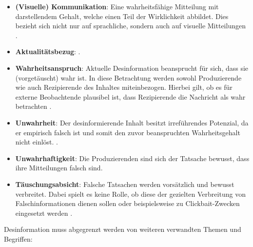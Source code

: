 \documentclass[12pt,a4paper]{article}        %
\begin{document}
\begin{itemize}
  \item \textbf{(Visuelle) Kommunikation}: Eine wahrheitsfähige Mitteilung mit darstellendem Gehalt, welche einen Teil der Wirklichkeit abbildet. Dies bezieht sich nicht nur auf sprachliche, sondern auch auf visuelle Mitteilungen \parencite[151]{marx_fake_2020}.
  \item \textbf{Aktualitätsbezug}:  \parencite[152]{marx_fake_2020}.
  \item \textbf{Wahrheitsanspruch}: Aktuelle Desinformation beansprucht für sich, dass sie (vorgetäuscht) wahr ist. In diese Betrachtung werden sowohl Produzierende wie auch Rezipierende des Inhaltes miteinbezogen. Hierbei gilt, ob es für externe Beobachtende plausibel ist, dass Rezipierende die Nachricht als wahr betrachten \parencite[153]{marx_fake_2020}.
  \item \textbf{Unwahrheit}: Der desinformierende Inhalt besitzt irreführendes Potenzial, da er empirisch falsch ist und somit den zuvor beanspruchten Wahrheitsgehalt nicht einlöst. \parencite[154]{marx_fake_2020}.
  \item \textbf{Unwahrhaftigkeit}: Die Produzierenden sind sich der Tatsache bewusst, dass ihre Mitteilungen falsch sind. \parencite[156]{marx_fake_2020}
  \item \textbf{Täuschungsabsicht}: Falsche Tatsachen werden vorsätzlich und bewusst verbreitet. Dabei spielt es keine Rolle, ob diese der gezielten Verbreitung von Falschinformationen dienen sollen oder beispielsweise zu Clickbait-Zwecken eingesetzt werden \parencites[157]{marx_fake_2020}[vgl.\ auch][2]{khan_fake_2021}.
\end{itemize}

Desinformation muss abgegrenzt werden von weiteren verwandten Themen und Begriffen:
\end{document}
